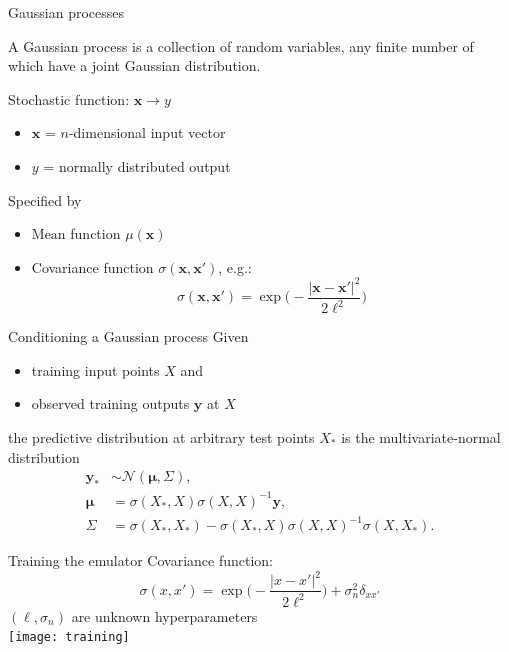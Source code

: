 \documentclass{beamer}
\newcommand{\x}{\mathbf x}
\newcommand{\y}{\mathbf y}
\begin{document}
\begin{frame}{Gaussian processes}
  \begin{definition}
    A Gaussian process is a collection of random variables, any finite number of which have a joint Gaussian distribution.
  \end{definition}
  \medskip
  Stochastic function: $\x \rightarrow y$ \\
  \begin{itemize}
    \item $\x$ = $n$-dimensional input vector
    \item $y$ = normally distributed output
  \end{itemize}
  Specified by
  \begin{itemize}
    \item Mean function $\mu(\x)$
    \item Covariance function $\sigma(\x, \x')$, e.g.:
      \begin{equation*}
        \sigma(\x, \x') = \exp\biggl( -\frac{|\x - \x'|^2}{2\ell^2} \biggr)
      \end{equation*}
  \end{itemize}
\end{frame}


\begin{frame}{Conditioning a Gaussian process}
  Given
  \begin{itemize}
    \item training input points $X$ and
    \item observed training outputs $\y$ at $X$
  \end{itemize}
  the predictive distribution at arbitrary test points $X_*$ is the multivariate-normal distribution
  \begin{align*}
    \y_* &\sim \mathcal N(\boldsymbol\mu, \Sigma), \\
    \boldsymbol\mu &= \sigma(X_*, X)\sigma(X, X)^{-1}\y, \\
    \Sigma &= \sigma(X_*,X_*) - \sigma(X_*,X)\sigma(X,X)^{-1}\sigma(X,X_*).
  \end{align*}
\end{frame}

\begin{frame}{Training the emulator}
  Covariance function:
  \begin{equation*}
    \sigma(x, x') = \exp\biggl( -\frac{|x - x'|^2}{2\ell^2} \biggr) +
                    \sigma_n^2\delta_{xx'}
  \end{equation*}
  $(\ell, \sigma_n)$ are unknown hyperparameters \\
  \bigskip
  \centering
  \texttt{[image: training]}
\end{frame}
\end{document}
